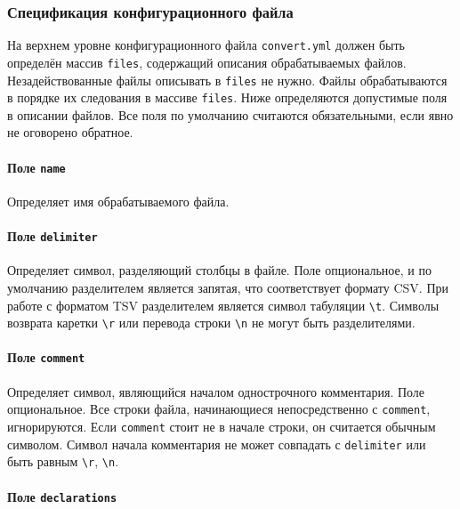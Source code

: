 \subsubsection{Спецификация конфигурационного файла}

На верхнем уровне конфигурационного файла \texttt{convert.yml} должен быть определён массив \texttt{files}, содержащий
описания обрабатываемых файлов. Незадействованные файлы описывать в \texttt{files} не нужно. Файлы обрабатываются в
порядке их следования в массиве \texttt{files}. Ниже определяются допустимые поля в описании файлов. Все поля по
умолчанию считаются обязательными, если явно не оговорено обратное.

\paragraph{Поле \texttt{name}}

Определяет имя обрабатываемого файла.

\paragraph{Поле \texttt{delimiter}}

Определяет символ, разделяющий столбцы в файле. Поле опциональное, и по умолчанию разделителем является запятая, что
соответствует формату CSV. При работе с форматом TSV разделителем является символ табуляции \texttt{\textbackslash t}.
Символы возврата каретки \texttt{\textbackslash r} или перевода строки \texttt{\textbackslash n} не могут быть
разделителями.

\paragraph{Поле \texttt{comment}}

Определяет символ, являющийся началом однострочного комментария. Поле опциональное. Все строки файла, начинающиеся
непосредственно с \texttt{comment}, игнорируются. Если \texttt{comment} стоит не в начале строки, он считается обычным
символом. Символ начала комментария не может совпадать с \texttt{delimiter} или быть равным \texttt{\textbackslash r},
\texttt{\textbackslash n}.

\paragraph{Поле \texttt{declarations}}

